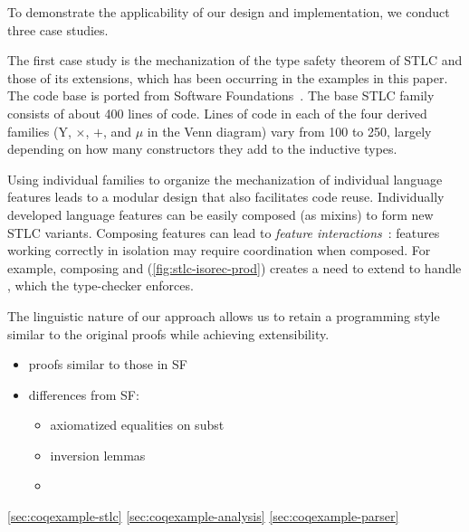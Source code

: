 To demonstrate the applicability of our design and implementation, we
conduct three case studies.



The first case study is the mechanization of the type safety theorem of
STLC and those of its extensions,
which has been occurring in the examples in this paper.
The code base is ported from Software Foundations~\cite{sf-pl}.
%
The base STLC family consists of about 400 lines of code.
Lines of code in each of the four derived families
($\mathrm{Y}$, $\times$, $+$, and $\mu$ in the Venn diagram)
vary from 100 to 250, largely depending on how many constructors they
add to the inductive types.



Using individual families to organize the mechanization of individual
language features leads to a modular design that also facilitates code reuse.
%
Individually developed language features can be easily composed (as
mixins) to form new STLC variants.
%
Composing features can lead to \emph{feature interactions}~\cite{batory2011feature}:
features working correctly in isolation may require coordination when composed.
For example, composing  and 
(\cref{fig:stlc-isorec-prod}) creates a need to extend  to
handle , which the type-checker enforces.

The linguistic nature of our approach allows us to retain a programming
style similar to the original proofs while achieving extensibility.

\begin{itemize}
\item 
proofs similar to those in SF
\item
differences from SF:
    \begin{itemize}
    \item 
    axiomatized equalities on subst
    \item
    inversion lemmas
    \item
    \end{itemize}
\end{itemize}

\bigskip 

\cref{sec:coqexample-stlc}
\cref{sec:coqexample-analysis}
\cref{sec:coqexample-parser}